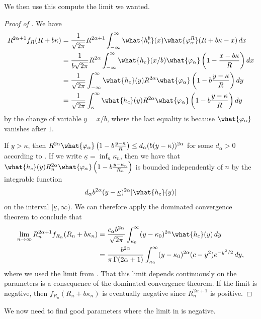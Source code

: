 \documentclass[12pt]{amsart}
\numberwithin{equation}{section}
\begin{document}
We then use this compute the limit we wanted.

\begin{proof}[Proof of ]
We have
\begin{align*}
R^{2\alpha+1}f_R(R+b\kappa) &= \frac{1}{\sqrt{2\pi}}R^{2\alpha+1}\int_{-\infty}^\infty \what{h_{c}^b}(x) \what{\varphi_\alpha^{R}}(R+b\kappa - x) \,dx \\
&= \frac{1}{b\sqrt{2\pi}} R^{2\alpha}\int_{-\infty}^\infty \what{h_{c}}(x/b) \what{\varphi_\alpha}\left(1 - \frac{x-b\kappa}{R}\right) dx \\
&= \frac{1}{\sqrt{2\pi}} \int_{-\infty}^\infty  \what{h_{c}}(y) R^{2\alpha} \what{\varphi_\alpha}\left(1 - b\frac{y-\kappa}{R}\right) dy \\
& = \frac{1}{\sqrt{2\pi}} \int_{\kappa}^\infty  \what{h_{c}}(y) R^{2\alpha} \what{\varphi_\alpha}\left(1 - b\frac{y-\kappa}{R}\right) dy
\end{align*}
by the change of variable $y=x/b$, where the last equality is because $\what{\varphi_\alpha}$ vanishes after $1$.

If $y > \kappa$, then $R^{2\alpha} \what{\varphi_\alpha}\left(1 - b\frac{y-\kappa}{R}\right) \leq d_\alpha (b(y- \kappa))^{2\alpha}$
for some $d_\alpha>0$ according to . If we write $\underline \kappa = \inf_{n} \kappa_n$, then we have that $\what{h_{c}}(y) R_n^{2\alpha} \what{\varphi_\alpha}\left(1 - b\frac{y-\kappa_n}{R_n}\right)$ is bounded independently of $n$ by the integrable function
\[
d_\alpha b^{2\alpha}(y- \underline \kappa)^{2\alpha} |\what{h_{c}}(y)|
\]
on the interval $[\underline \kappa,\infty)$. We can therefore apply the dominated convergence theorem to conclude that
\begin{align*}
\lim_{n \to \infty} R_n^{2\alpha+1}f_{R_n}(R_n+b\kappa_n) &= \frac{c_\alpha b^{2\alpha}}{\sqrt{2\pi}} \int_{\kappa_0}^\infty (y - \kappa_0)^{2\alpha}\what{h_c}(y)\,dy \\
&=\frac{b^{2\alpha}}{\pi \, \Gamma(2\alpha+1)} \int_{\kappa_0}^\infty (y - \kappa_0)^{2\alpha}(c-y^2) e^{-y^2/2}\,dy ,
\end{align*}
where we used the limit from .  That this limit depends continuously on the parameters is a consequence of the dominated convergence theorem.  If the limit is negative, then $f_{R_n}(R_n+b\kappa_n)$ is eventually negative since $R_n^{2\alpha +1}$ is positive.
\end{proof}

We now need to find good parameters where the limit in  is negative.
\end{document}
